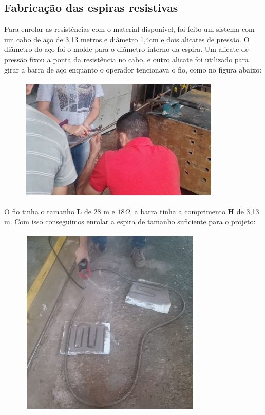 \subsection{Fabricação das espiras resistivas}
Para enrolar as resistências com o material disponível, foi feito um sistema com um cabo de aço de 3,13 metros e diâmetro 1,4cm e dois alicates de pressão. O diâmetro do aço foi o molde para o diâmetro interno da espira. Um alicate de pressão fixou a ponta da resistência no cabo, e outro alicate foi utilizado para girar a barra de aço enquanto o operador tencionava o fio, como no figura abaixo:
\begin{figure}[!ht]
	\centering
	\label{foto1}
	\includegraphics[keepaspectratio=true,scale=1.0]{figuras/alimentacao6.JPG}
\end{figure}

O fio tinha o tamanho \textbf{L} de 28 m e $18\Omega$, a barra tinha a comprimento \textbf{H} de 3,13 m. Com isso conseguimos enrolar a espira de tamanho suficiente para o projeto:
\begin{figure}[!ht]
	\centering
	\label{foto2}
	\includegraphics[keepaspectratio=true,scale=1.0]{figuras/alimentacao7.JPG}
\end{figure}

